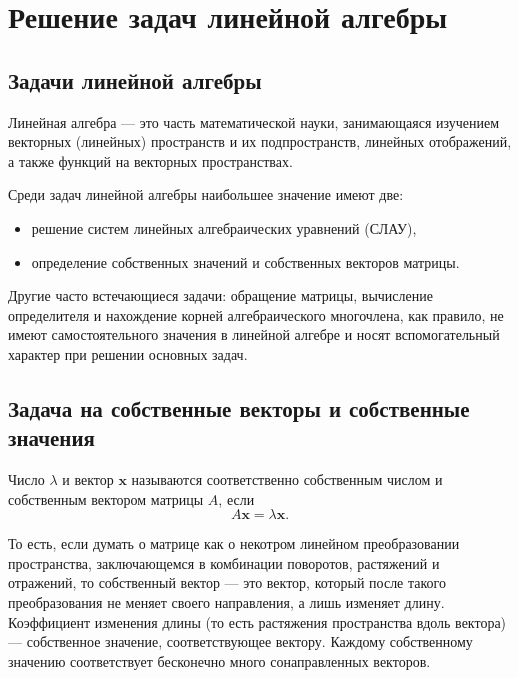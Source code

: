 \section{Решение задач линейной алгебры}


\subsection{Задачи линейной алгебры}

Линейная алгебра — это часть математической науки, занимающаяся
изучением векторных (линейных) пространств и их подпространств,
линейных отображений, а также функций на векторных пространствах.

Среди задач линейной алгебры наибольшее значение имеют две:

\begin{itemize}
\item решение систем линейных алгебраических уравнений (СЛАУ),
\item определение собственных значений и собственных векторов матрицы.
\end{itemize}

Другие часто встечающиеся задачи: обращение матрицы, вычисление
определителя и нахождение корней алгебраического многочлена, как
правило, не имеют самостоятельного значения в линейной алгебре и носят
вспомогательный характер при решении основных задач.


\subsection{Задача на собственные векторы и собственные значения}

Число $\lambda$ и вектор $\mathbf{x}$ называются соответственно
собственным числом и собственным вектором матрицы $A$, если
\[
A\mathbf{x}=\lambda\mathbf{x}.
\]


То есть, если думать о матрице как о некотром линейном преобразовании
пространства, заключающемся в комбинации поворотов, растяжений и отражений,
то собственный вектор — это вектор, который после такого преобразования
не меняет своего направления, а лишь изменяет длину. Коэффициент изменения
длины (то есть растяжения пространства вдоль вектора) — собственное
значение, соответствующее вектору. Каждому собственному значению соответствует
бесконечно много сонаправленных векторов.

